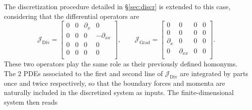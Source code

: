 \documentclass{svjour3}                     %
\newcommand{\secref}[1]{\S\ref{#1}}
\DeclareMathOperator*{\Grad}{Grad}
\DeclareMathOperator*{\Div}{Div}
\begin{document}
The discretization procedure detailed in \secref{sec:discr} is extended to this case, considering that the differential operators are 
\[
\bm{\mathcal{J}}_{\Div} = \begin{bmatrix}
0 & 0 & \partial_x & 0 \\
0 & 0 & 0 & -\partial_{xx} \\
0 & 0 & 0 & 0 \\
0 & 0 & 0 & 0 \\
\end{bmatrix}, \qquad 
\bm{\mathcal{J}}_{\Grad} = \begin{bmatrix}
0 & 0 & 0 & 0 \\
0 & 0 & 0 & 0 \\
\partial_x & 0 & 0 & 0 \\
0 & \partial_{xx} & 0 & 0 \\
\end{bmatrix}.
\]
These two operators play the same role as their previously defined homonyms. The 2 PDEs associated to the first and second line of $\bm{\mathcal{J}}_{\Div}$ are integrated by parts once and twice respectively, so that the boundary forces and momenta are naturally included in the discretized system as inputs. The finite-dimensional system then reads
\end{document}
